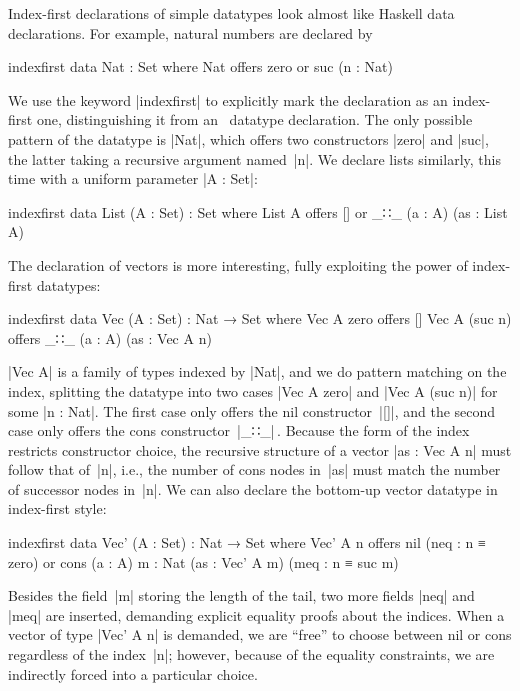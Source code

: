Index-first declarations of simple datatypes look almost like Haskell data declarations.
For example, natural numbers are declared by
\begin{code}
indexfirst data Nat : Set where
  Nat  offers  zero
       or      suc (n : Nat)
\end{code}
We use the keyword |indexfirst| to explicitly mark the declaration as an index-first one, distinguishing it from an \Agda\ datatype declaration.
The only possible pattern of the datatype is |Nat|, which offers two constructors |zero| and |suc|, the latter taking a recursive argument named~|n|.
We declare lists similarly, this time with a uniform parameter |A : Set|:
\begin{code}
indexfirst data List (A : Set) : Set where
  List A  offers  []
          or      _∷_ (a : A) (as : List A)
\end{code}
The declaration of vectors is more interesting, fully exploiting the power of index-first datatypes:
\begin{code}
indexfirst data Vec (A : Set) : Nat → Set where
  Vec A zero     offers  []
  Vec A (suc n)  offers  _∷_ (a : A) (as : Vec A n)
\end{code}
|Vec A| is a family of types indexed by |Nat|, and we do pattern matching on the index, splitting the datatype into two cases |Vec A zero| and |Vec A (suc n)| for some |n : Nat|.
The first case only offers the nil constructor~|[]|, and the second case only offers the cons constructor~|_∷_|\,.
Because the form of the index restricts constructor choice, the recursive structure of a vector |as : Vec A n| must follow that of~|n|, i.e., the number of cons nodes in~|as| must match the number of successor nodes in~|n|.
We can also declare the bottom-up vector datatype in index-first style:
\begin{code}
indexfirst data Vec' (A : Set) : Nat → Set where
  Vec' A n  offers  nil (neq : n ≡ zero)
            or      cons  (a : A) {m : Nat}
                          (as : Vec' A m) (meq : n ≡ suc m)
\end{code}
Besides the field~|m| storing the length of the tail, two more fields |neq| and |meq| are inserted, demanding explicit equality proofs about the indices.
When a vector of type |Vec' A n| is demanded, we are ``free'' to choose between nil or cons regardless of the index~|n|; however, because of the equality constraints, we are indirectly forced into a particular choice.



